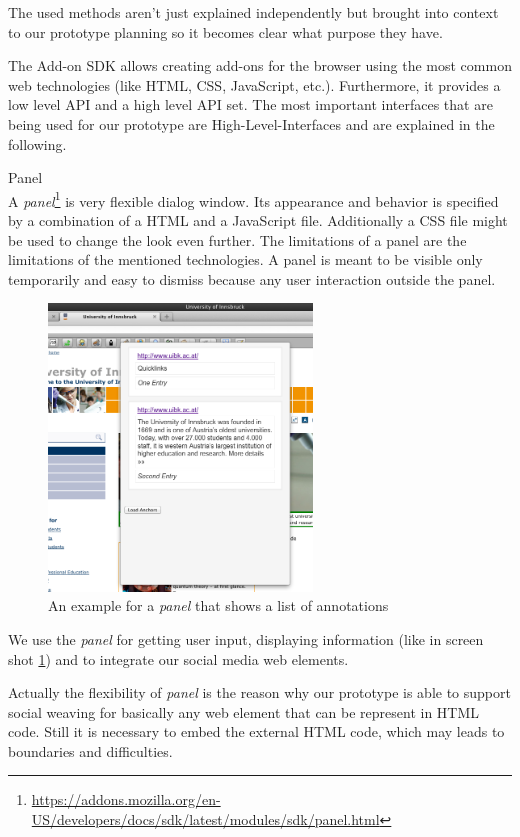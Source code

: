 The used methods aren't just explained independently but brought into context to our prototype planning so it becomes clear what purpose they have. 

The Add-on SDK allows creating add-ons for the browser using the most common web technologies (like HTML, CSS, JavaScript, etc.). Furthermore, it provides a low level API and a high level API set. The most important interfaces that are being used for our prototype are High-Level-Interfaces and are explained in the following.

\begin{description}
\item Panel\\
A \emph{panel}\footnote{\url{https://addons.mozilla.org/en-US/developers/docs/sdk/latest/modules/sdk/panel.html}} is very flexible dialog window. Its appearance and behavior is specified by a combination of a HTML and a JavaScript file. Additionally a CSS file might be used to change the look even further. The limitations of a panel are the limitations of the mentioned technologies. 
A panel is meant to be visible only temporarily and easy to dismiss because any user interaction outside the panel.

\begin{figure}\centering
		\includegraphics[width=7cm]{images/example-panel.png}
		\caption{An example for a \emph{panel} that shows a list of annotations}
		\label{example-panel}
\end{figure} 

We use the \emph{panel} for getting user input, displaying information (like in screen shot \ref{example-panel}) and to integrate our social media web elements. 

Actually the flexibility of \emph{panel} is the reason why our prototype is able to support social weaving for basically any web element that can be represent in HTML code. Still it is necessary to embed the external HTML code, which may leads to boundaries and difficulties.


\end{description}
